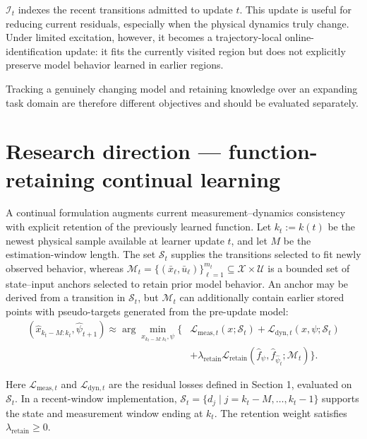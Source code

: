 \documentclass[a4paper]{article}
\begin{document}
$\mathcal I_t$ indexes the recent transitions admitted to update $t$. This
update is useful for reducing current residuals, especially when the physical
dynamics truly change. Under limited excitation, however, it becomes a
trajectory-local online-identification update: it fits the currently visited
region but does not explicitly preserve model behavior learned in earlier
regions.

Tracking a genuinely changing model and retaining knowledge over an expanding
task domain are therefore different objectives and should be evaluated
separately.

\section{Research direction — function-retaining continual learning}

A continual formulation augments current measurement--dynamics consistency
with explicit retention of the previously learned function. Let
$k_t:=k(t)$ be the newest physical sample available at learner update $t$, and
let $M$ be the estimation-window length. The set $\mathcal S_t$ supplies the
transitions selected to fit newly observed behavior, whereas
$\mathcal M_t=\{(\bar x_\ell,\bar u_\ell)\}_{\ell=1}^{m_t}
\subseteq\mathcal X\times\mathcal U$ is a bounded set of state--input anchors
selected to retain prior model behavior. An anchor may be derived from a
transition in $\mathcal S_t$, but $\mathcal M_t$ can additionally contain
earlier stored points with pseudo-targets generated from the pre-update model:
\begin{equation}
  \begin{aligned}
  \left(
  \widehat x_{k_t-M:k_t},
  \widehat\psi_{t+1}
  \right)
  \approx
  \arg\min_{x_{k_t-M:k_t},\psi}
  \Big\{&
  \mathcal L_{\mathrm{meas},t}(x;\mathcal S_t)
  +
  \mathcal L_{\mathrm{dyn},t}(x,\psi;\mathcal S_t)\\
  &+
  \lambda_{\mathrm{retain}}
  \mathcal L_{\mathrm{retain}}
  \!\left(
  \widehat f_{\psi},
  \widehat f_{\widehat\psi_t};
  \mathcal M_t
  \right)
  \Big\}.
  \end{aligned}
\end{equation}

Here $\mathcal L_{\mathrm{meas},t}$ and
$\mathcal L_{\mathrm{dyn},t}$ are the residual losses defined in Section 1,
evaluated on $\mathcal S_t$. In a recent-window implementation,
$\mathcal S_t=\{d_j\mid j=k_t-M,\ldots,k_t-1\}$ supports the state and
measurement window ending at $k_t$. The retention weight satisfies
$\lambda_{\mathrm{retain}}\ge0$.
\end{document}
